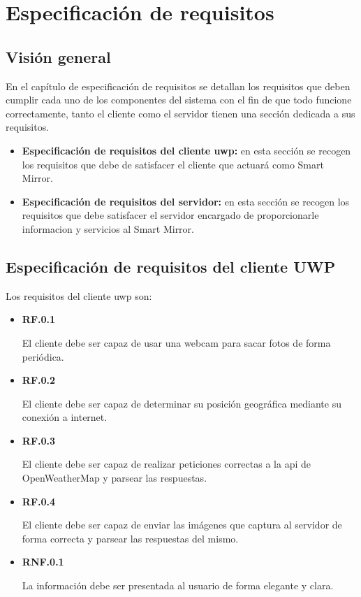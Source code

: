 \chapter{Especificación de requisitos}

\section{Visión general}

En el capítulo de especificación de requisitos se detallan los requisitos que deben cumplir cada uno de los componentes del sistema con el fin de que todo funcione correctamente, tanto el cliente como el servidor tienen una sección dedicada a sus requisitos.

\begin{itemize}
	\item \textbf{Especificación de requisitos del cliente \acrshort{uwp}:} en esta sección se recogen los requisitos que debe de satisfacer el cliente que actuará como Smart Mirror.

	\item \textbf{Especificación de requisitos del servidor:} en esta sección se recogen los requisitos que debe satisfacer el servidor encargado de proporcionarle informacion y servicios al Smart Mirror.
\end{itemize}

\section{Especificación de requisitos del cliente UWP}

Los requisitos del cliente \acrshort{uwp} son:

\begin{itemize}
	\item \textbf{RF.0.1}

	El cliente debe ser capaz de usar una webcam para sacar fotos de forma periódica.

	\item \textbf{RF.0.2}

	El cliente debe ser capaz de determinar su posición geográfica mediante su conexión a internet.

	\item \textbf{RF.0.3}

	El cliente debe ser capaz de realizar peticiones correctas a la \acrshort{api} de OpenWeatherMap y parsear las respuestas.

	\item \textbf{RF.0.4}

	El cliente debe ser capaz de enviar las imágenes que captura al servidor de forma correcta y parsear las respuestas del mismo.

	\item \textbf{RNF.0.1}

	La información debe ser presentada al usuario de forma elegante y clara.

\end{itemize}


